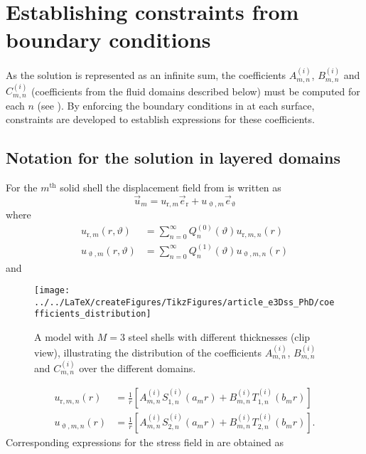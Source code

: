 \section{Establishing constraints from boundary conditions}
\label{Sec1:estabConstraints}
As the solution is represented as an infinite sum, the coefficients $A_{m,n}^{(i)}$, $B_{m,n}^{(i)}$ and $C_{m,n}^{(i)}$ (coefficients from the fluid domains described below) must be computed for each $n$ (see ). By enforcing the boundary conditions in  at each surface, constraints are developed to establish expressions for these coefficients.

\subsection{Notation for the solution in layered domains}
For the $m^{\mathrm{th}}$ solid shell the displacement field from  is written as
\begin{equation}
	\vec{u}_m = u_{\mathrm{r},m} \vec{e}_{\mathrm{r}} + u_{\upvartheta,m} \vec{e}_\upvartheta
\end{equation}
where
\begin{align}
	u_{\mathrm{r},m}(r,\vartheta) &= \sum_{n=0}^\infty Q_n^{(0)}(\vartheta)u_{\mathrm{r},m,n}(r) \label{Eq1:u_r}\\
	u_{\upvartheta,m}(r,\vartheta) &= \sum_{n=0}^\infty Q_n^{(1)}(\vartheta)u_{\upvartheta,m,n}(r)
\end{align}
and 
\begin{figure}
	\centering
	\texttt{[image: ../../LaTeX/createFigures/TikzFigures/article\_e3Dss\_PhD/coefficients\_distribution]}
	\caption{A model with $M=3$ steel shells with different thicknesses (clip view), illustrating the distribution of the coefficients $A_{m,n}^{(i)}$, $B_{m,n}^{(i)}$ and $C_{m,n}^{(i)}$ over the different domains.}
	\label{Fig1:coefficients}
\end{figure}
\begin{align}
	u_{\mathrm{r},m,n}(r) &= \frac{1}{r}\left[A_{m,n}^{(i)}S_{1,n}^{(i)}(a_m r)+B_{m,n}^{(i)}T_{1,n}^{(i)}(b_m r)\right]\\
	u_{\upvartheta,m,n}(r) &= \frac{1}{r}\left[A_{m,n}^{(i)}S_{2,n}^{(i)}(a_m r)+B_{m,n}^{(i)}T_{2,n}^{(i)}(b_m r)\right].
\end{align}
Corresponding expressions for the stress field in  are obtained as
